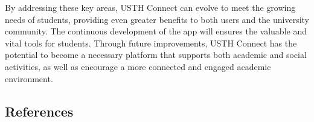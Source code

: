 \documentclass{article}
\begin{document}
By addressing these key areas, USTH Connect can evolve to meet the growing needs of students, providing even greater benefits to both users and the university community. The continuous development of the app will ensures the valuable and vital tools for students.
Through future improvements, USTH Connect has the potential to become a necessary platform that supports both academic and social activities, as well as encourage a more connected and engaged academic environment.
\subsection{References}
\begingroup
\renewcommand{\bibname}{} 
 
 
\endgroup
\end{document}
